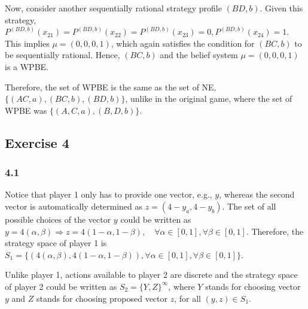\documentclass[]{article}
\begin{document}
\begin{enumerate}[label=(\roman*)]
	Now, consider another sequentially rational strategy profile $(BD, b)$. Given this strategy, $P^{(BD, b)}(x_{21}) = P^{(BD, b)}(x_{22}) = P^{(BD, b)}(x_{23}) = 0, P^{(BD, b)}(x_{24}) = 1$. This implies $\mu = (0, 0, 0, 1)$, which again satisfies the condition for $(BC, b)$ to be sequentially rational. Hence, $(BC, b)$ and the belief system $\mu = (0, 0, 0, 1)$ is a WPBE.
	
	Therefore, the set of WPBE is the same as the set of NE, $\{(AC, a), (BC, b), (BD, b)\}$, unlike in the original game, where the set of WPBE was $\{(A, C, a), (B, D, b)\}$.
\end{enumerate}

\subsection*{Exercise 4}

\subsubsection*{4.1}
Notice that player 1 only has to provide one vector, e.g., $y$, whereas the second vector is automatically determined as $z = (4 - y_a, 4 - y_b)$. The set of all possible choices of the vector $y$ could be written as $y = 4(\alpha, \beta) \Longrightarrow z = 4(1 - \alpha, 1 - \beta), \quad\forall\alpha\in[0, 1], \forall\beta\in[0, 1]$. Therefore, the strategy space of player 1 is $S_1 = \{(4(\alpha, \beta), 4 (1 - \alpha, 1 - \beta)), \forall\alpha\in[0, 1], \forall\beta\in[0, 1]\}$.

Unlike player 1, actions available to player 2 are discrete and the strategy space of player 2 could be written as $S_2 = \{Y, Z\}^{\infty}$, where $Y$ stands for choosing vector $y$ and $Z$ stands for choosing proposed vector $z$, for all $(y,z)\in S_1$. 
\end{document}
